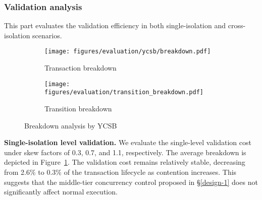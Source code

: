 \subsubsection{Validation analysis\label{sec:evaluation:transition}}
This part evaluates the validation efficiency in both single-isolation and cross-isolation scenarios. 

\begin{figure}[t]
    \centering
    \begin{subfigure}{0.47\linewidth}
        \centering
        \texttt{[image: figures/evaluation/ycsb/breakdown.pdf]}
        \vspace{-6mm}
        \caption{Transaction breakdown}
        \label{fig:evaluation.breakdown.transaction}
    \end{subfigure}
    \begin{subfigure}{0.47\linewidth}
        \centering
        \texttt{[image: figures/evaluation/transition\_breakdown.pdf]}
        \vspace{-6mm}
        \caption{Transition breakdown}
        \label{fig:evaluation.breakdown.transition}
    \end{subfigure}
    \vspace{-4mm}
    \caption{Breakdown analysis by YCSB}
    \label{fig:evaluation.dynamic.breakdown}
    \vspace{-4mm}
\end{figure}


\noindent\textbf{Single-isolation level validation.} 
We evaluate the single-level validation cost under skew factors of 0.3, 0.7, and 1.1, respectively. The average breakdown is depicted in Figure~\ref{fig:evaluation.breakdown.transaction}. The validation cost remains relatively stable, decreasing from 2.6\% to 0.3\% of the transaction lifecycle as contention increases. This suggests that the middle-tier concurrency control proposed in \S\ref{design-1} does not significantly affect normal execution.

